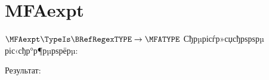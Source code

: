 \section{MFAexpt}
\begin{frame}{$\MFAexpt\TypeIs\BRefRegexTYPE\to\MFATYPE$}
	Сђрµрісѓр»сџсђрѕрѕрµ ріс‹сђр°р¶рµрѕрёрµ:

	Результат:
\end{frame}